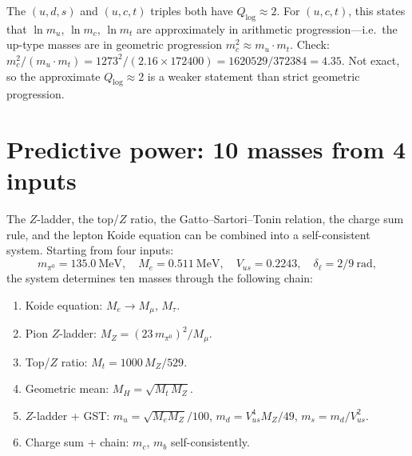 \documentclass[11pt]{article}
\begin{document}
\noindent
The $(u,d,s)$ and $(u,c,t)$ triples both have
$Q_{\log}\approx 2$.  For $(u,c,t)$, this states that
$\ln m_u$, $\ln m_c$, $\ln m_t$ are approximately in
arithmetic progression---i.e.\ the up-type masses are
in geometric progression $m_c^2 \approx m_u\cdot m_t$.
Check: $m_c^2/(m_u\cdot m_t) = 1273^2/(2.16\times
172400) = 1620529/372384 = 4.35$.  Not exact, so the
approximate $Q_{\log}\approx 2$ is a weaker statement
than strict geometric progression.

\section{Predictive power: 10 masses from 4 inputs}

The $Z$-ladder, the top/$Z$ ratio, the Gatto--Sartori--Tonin
relation, the charge sum rule, and the lepton Koide equation
can be combined into a self-consistent system.
Starting from four inputs:
\begin{equation}
  m_{\pi^0} = 135.0~\text{MeV},\quad
  M_e = 0.511~\text{MeV},\quad
  V_{us} = 0.2243,\quad
  \delta_\ell = 2/9~\text{rad},
\end{equation}
the system determines ten masses through the following chain:

\begin{enumerate}
\item Koide equation: $M_e \to M_\mu,\,M_\tau$.
\item Pion $Z$-ladder: $M_Z = (23\,m_{\pi^0})^2/M_\mu$.
\item Top/$Z$ ratio: $M_t = 1000\,M_Z/529$.
\item Geometric mean: $M_H = \sqrt{M_t\,M_Z}$.
\item $Z$-ladder + GST:
  $m_u = \sqrt{M_e M_Z}/100$,\;
  $m_d = V_{us}^4 M_Z/49$,\;
  $m_s = m_d/V_{us}^2$.
\item Charge sum + chain:
  $m_c$, $m_b$ self-consistently.
\end{enumerate}
\end{document}

